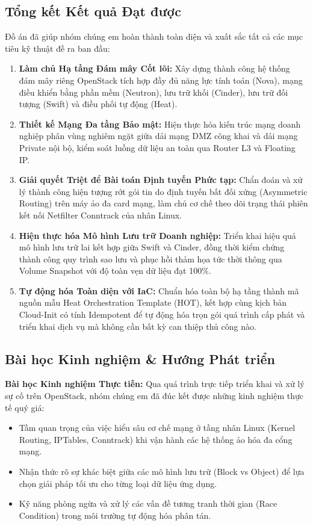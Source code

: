 \subsection{Tổng kết Kết quả Đạt được}
Đồ án đã giúp nhóm chúng em hoàn thành toàn diện và xuất sắc tất cả các mục tiêu kỹ thuật đề ra ban đầu:
\begin{enumerate}
    \item \textbf{Làm chủ Hạ tầng Đám mây Cốt lõi:} Xây dựng thành công hệ thống đám mây riêng OpenStack tích hợp đầy đủ năng lực tính toán (Nova), mạng điều khiển bằng phần mềm (Neutron), lưu trữ khối (Cinder), lưu trữ đối tượng (Swift) và điều phối tự động (Heat).
    \item \textbf{Thiết kế Mạng Đa tầng Bảo mật:} Hiện thực hóa kiến trúc mạng doanh nghiệp phân vùng nghiêm ngặt giữa dải mạng DMZ công khai và dải mạng Private nội bộ, kiểm soát luồng dữ liệu an toàn qua Router L3 và Floating IP.
    \item \textbf{Giải quyết Triệt để Bài toán Định tuyến Phức tạp:} Chẩn đoán và xử lý thành công hiện tượng rớt gói tin do định tuyến bất đối xứng (Asymmetric Routing) trên máy ảo đa card mạng, làm chủ cơ chế theo dõi trạng thái phiên kết nối Netfilter Conntrack của nhân Linux.
    \item \textbf{Hiện thực hóa Mô hình Lưu trữ Doanh nghiệp:} Triển khai hiệu quả mô hình lưu trữ lai kết hợp giữa Swift và Cinder, đồng thời kiểm chứng thành công quy trình sao lưu và phục hồi thảm họa tức thời thông qua Volume Snapshot với độ toàn vẹn dữ liệu đạt 100\%.
    \item \textbf{Tự động hóa Toàn diện với IaC:} Chuẩn hóa toàn bộ hạ tầng thành mã nguồn mẫu Heat Orchestration Template (HOT), kết hợp cùng kịch bản Cloud-Init có tính Idempotent để tự động hóa trọn gói quá trình cấp phát và triển khai dịch vụ mà không cần bất kỳ can thiệp thủ công nào.
\end{enumerate}

\subsection{Bài học Kinh nghiệm \& Hướng Phát triển}
\noindent \textbf{Bài học Kinh nghiệm Thực tiễn:}
Qua quá trình trực tiếp triển khai và xử lý sự cố trên OpenStack, nhóm chúng em đã đúc kết được những kinh nghiệm thực tế quý giá:
\begin{itemize}
    \item Tầm quan trọng của việc hiểu sâu cơ chế mạng ở tầng nhân Linux (Kernel Routing, IPTables, Conntrack) khi vận hành các hệ thống ảo hóa đa cổng mạng.
    \item Nhận thức rõ sự khác biệt giữa các mô hình lưu trữ (Block vs Object) để lựa chọn giải pháp tối ưu cho từng loại dữ liệu ứng dụng.
    \item Kỹ năng phòng ngừa và xử lý các vấn đề tương tranh thời gian (Race Condition) trong môi trường tự động hóa phân tán.
\end{itemize}

